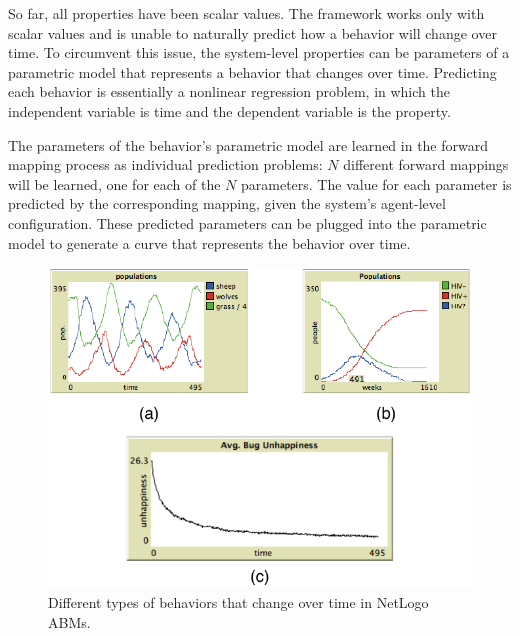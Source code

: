 So far, all properties have been scalar values.
The framework works only with scalar values and is unable to naturally predict how a behavior will change over time.
To circumvent this issue, the system-level properties can be parameters of a parametric model that represents a behavior that changes over time.
Predicting each behavior is essentially a nonlinear regression problem, in which the independent variable is time and the dependent variable is the property.

The parameters of the behavior's parametric model are learned in the forward mapping process as individual prediction problems: $N$ different forward mappings will be learned, one for each of the $N$ parameters.
The value for each parameter is predicted by the corresponding mapping, given the system's agent-level configuration.
These predicted parameters can be plugged into the parametric model to generate a curve that represents the behavior over time.

\begin{figure}[ht]
\centering
\includegraphics{images/overtime_compare.pdf}
\caption{Different types of behaviors that change over time in NetLogo ABMs. }
\label{fig:overtime_compare}
\end{figure}


